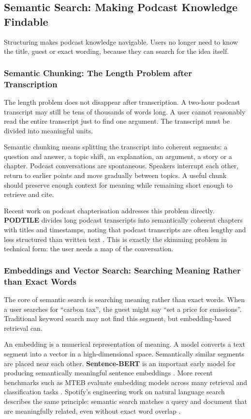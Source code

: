 \documentclass[11pt,a4paper]{article}
\begin{document}
\subsection{Semantic Search: Making Podcast Knowledge Findable}

Structuring makes podcast knowledge navigable. Users no longer need to know the title, guest or exact wording, because they can search for the idea itself.

\subsubsection{Semantic Chunking: The Length Problem after Transcription}

The length problem does not disappear after transcription. A two-hour podcast transcript may still be tens of thousands of words long. A user cannot reasonably read the entire transcript just to find one argument. The transcript must be divided into meaningful units.

Semantic chunking means splitting the transcript into coherent segments: a question and answer, a topic shift, an explanation, an argument, a story or a chapter. Podcast conversations are spontaneous. Speakers interrupt each other, return to earlier points and move gradually between topics. A useful chunk should preserve enough context for meaning while remaining short enough to retrieve and cite.

Recent work on podcast chapterisation addresses this problem directly. \textbf{PODTILE} divides long podcast transcripts into semantically coherent chapters with titles and timestamps, noting that podcast transcripts are often lengthy and less structured than written text \cite{PODTILE2024}. This is exactly the skimming problem in technical form: the user needs a map of the conversation.

\subsubsection{Embeddings and Vector Search: Searching Meaning Rather than Exact Words}

The core of semantic search is searching meaning rather than exact words. When a user searches for ``carbon tax'', the guest might say ``set a price for emissions''. Traditional keyword search may not find this segment, but embedding-based retrieval can.

An embedding is a numerical representation of meaning. A model converts a text segment into a vector in a high-dimensional space. Semantically similar segments are placed near each other. \textbf{Sentence-BERT} is an important early model for producing semantically meaningful sentence embeddings \cite{Reimers2019SBERT}. More recent benchmarks such as MTEB evaluate embedding models across many retrieval and classification tasks \cite{Muennighoff2023MTEB}. Spotify's engineering work on natural language search describes the same principle: semantic search matches a query and document that are meaningfully related, even without exact word overlap \cite{Spotify2022NLS}.
\end{document}
